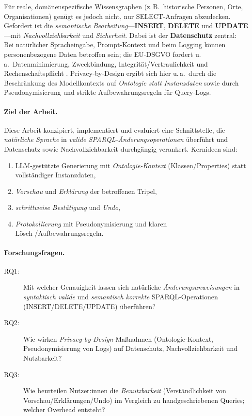 Für reale, domänenspezifische Wissensgraphen (z.\,B.\ historische Personen, Orte, Organisationen) genügt es jedoch nicht, nur SELECT-Anfragen abzudecken. Gefordert ist die \emph{semantische Bearbeitung}—\textbf{INSERT}, \textbf{DELETE} und \textbf{UPDATE}—mit \emph{Nachvollziehbarkeit} und \emph{Sicherheit}. Dabei ist der \textbf{Datenschutz} zentral: Bei natürlicher Spracheingabe, Prompt-Kontext und beim Logging können personenbezogene Daten betroffen sein; die EU-DSGVO fordert u.\,a.\ Datenminimierung, Zweckbindung, Integrität/Vertraulichkeit und Rechenschaftspflicht \cite{euGDPR2016}. Privacy-by-Design ergibt sich hier u.\,a.\ durch die Beschränkung des Modellkontexts auf \emph{Ontologie statt Instanzdaten} sowie durch Pseudo\-nymisierung und strikte Aufbewahrungsregeln für Query-Logs.

\paragraph{Ziel der Arbeit.}
Diese Arbeit konzipiert, implementiert und evaluiert eine Schnittstelle, die \emph{natürliche Sprache} in \emph{valide SPARQL-Änderungsoperationen} überführt und Datenschutz sowie Nachvollziehbarkeit durchgängig verankert. Kernideen sind:
\begin{enumerate}
\item LLM-gestützte Generierung mit \emph{Ontologie-Kontext} (Klassen/Properties) statt vollständiger Instanzdaten,
\item \emph{Vorschau} und \emph{Erklärung} der betroffenen Tripel,
\item \emph{schrittweise Bestätigung} und \emph{Undo},
\item \emph{Protokollierung} mit Pseudonymisierung und klaren Lösch-/Aufbewahrungsregeln.
\end{enumerate}

\paragraph{Forschungsfragen.}
\begin{description}
\item[RQ1:] Mit welcher Genauigkeit lassen sich natürliche \emph{Änderungsanweisungen} in \emph{syntaktisch valide} und \emph{semantisch korrekte} SPARQL-Operationen (INSERT/DELETE/UPDATE) überführen?
\item[RQ2:] Wie wirken \emph{Privacy-by-Design}-Maßnahmen (Ontologie-Kontext, Pseudonymisierung von Logs) auf Datenschutz, Nachvollziehbarkeit und Nutzbarkeit?
\item[RQ3:] Wie beurteilen Nutzer:innen die \emph{Benutzbarkeit} (Verständlichkeit von Vorschau/Erklärungen/Undo) im Vergleich zu handgeschriebenen Queries; welcher Overhead entsteht?
\end{description}


